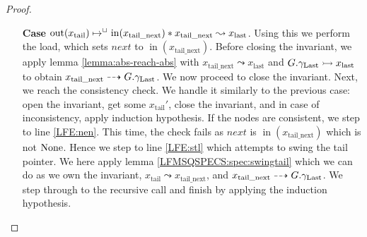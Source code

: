 \documentclass[a4paper, 10pt]{report}
\theoremstyle{definition}
\newcommand{\nIn}[1]{\operatorname{in}(#1)}
\newcommand{\nOut}[1]{\operatorname{out}(#1)}
\newcommand{\node}{x}
\newcommand{\nodeN}[1]{\node_{\mathrm{#1}}}
\newcommand{\nodetail}{\nodeN{tail}}
\newcommand{\nodelast}{\nodeN{last}}
\newcommand{\nodetailnext}{\nodeN{tail\_next}}
\newcommand{\Qg}{G}
\newcommand{\glast}{\gname_{\mathrm{Last}}}
\newcommand{\reach}[2]{#1 \leadsto #2}
\newcommand{\ar}[2]{#1 \dashrightarrow #2}
\newcommand{\ap}[2]{#1 \rightarrowtail #2}
\begin{document}
\begin{proof}
\begin{itemize}
    \item[\textbf{Case}]
    $\nOut{\nodetail} \mapsto^{\persistently} \nIn{\nodetailnext} \star{} \reach{\nodetailnext}{\nodelast}$. Using this we perform the load, which sets $next$ to $\nIn{\nodetailnext}$. Before closing the invariant, we apply lemma \ref{lemma:abs-reach-abs} with $\reach{\nodetailnext}{\nodelast}$ and $\ap{\Qg.\glast}{\nodelast}$ to obtain $\ar{\nodetailnext}{\Qg.\glast}$. We now proceed to close the invariant. Next, we reach the consistency check. We handle it similarly to the previous case: open the invariant, get some $\nodetail'$, close the invariant, and in case of inconsistency, apply induction hypothesis. If the nodes are consistent, we step to line \ref{LFE:nen}. This time, the check fails as $next$ is $\nIn{\nodetailnext}$ which is not $\operatorname{None}$. Hence we step to line \ref{LFE:stl} which attempts to swing the tail pointer. We here apply lemma \ref{LFMSQSPECS:spec:swingtail} which we can do as we own the invariant, $\reach{\nodetail}{\nodetailnext}$, and $\ar{\nodetailnext}{\Qg.\glast}$. We step through to the recursive call and finish by applying the induction hypothesis.
  \end{itemize}
\end{proof}
\end{document}

